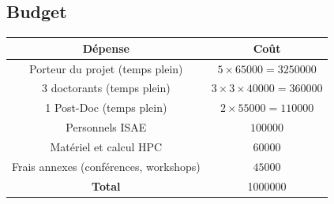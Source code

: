 \documentclass[french]{article}
\begin{document}
\subsection{Budget}
\begin{center}
\begin{tabular}{|c|c|}
	\hline
	D\'epense & Co\^{u}t \\
	\hline
	Porteur du projet (temps plein) & $5\times 65000=3250000$ \\
	3 doctorants (temps plein) & $3\times 3\times 40000=360000$  \\
	1 Post-Doc (temps plein) & $2\times 55000=110000$ \\
	Personnels ISAE & $100000$ \\
	Matériel  et calcul HPC & $60000$ \\
	Frais annexes (conférences, workshops) & $45000$ \\
	\hline
	\textbf{Total} & 1000000 \\
	\hline
\end{tabular}
\end{center}



\footnotesize


\end{document}
